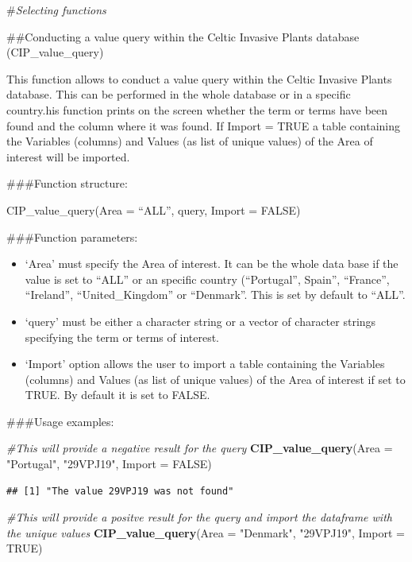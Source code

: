 \documentclass[
]{article}
\newenvironment{Shaded}{\begin{snugshade}}{\end{snugshade}}
\newcommand{\AttributeTok}[1]{\textcolor[rgb]{0.13,0.29,0.53}{#1}}
\newcommand{\CommentTok}[1]{\textcolor[rgb]{0.56,0.35,0.01}{\textit{#1}}}
\newcommand{\ConstantTok}[1]{\textcolor[rgb]{0.56,0.35,0.01}{#1}}
\newcommand{\FunctionTok}[1]{\textcolor[rgb]{0.13,0.29,0.53}{\textbf{#1}}}
\newcommand{\NormalTok}[1]{#1}
\newcommand{\StringTok}[1]{\textcolor[rgb]{0.31,0.60,0.02}{#1}}
\providecommand{\tightlist}{%
  \setlength{\itemsep}{0pt}\setlength{\parskip}{0pt}}
\begin{document}
\#\emph{Selecting functions}

\#\#Conducting a value query within the Celtic Invasive Plants database
(CIP\_value\_query)

This function allows to conduct a value query within the Celtic Invasive
Plants database. This can be performed in the whole database or in a
specific country.his function prints on the screen whether the term or
terms have been found and the column where it was found. If Import =
TRUE a table containing the Variables (columns) and Values (as list of
unique values) of the Area of interest will be imported.

\#\#\#Function structure:

CIP\_value\_query(Area = ``ALL'', query, Import = FALSE)

\#\#\#Function parameters:

\begin{itemize}
\tightlist
\item
  `Area' must specify the Area of interest. It can be the whole data
  base if the value is set to ``ALL'' or an specific country
  (``Portugal'', Spain'', ``France'', ``Ireland'', ``United\_Kingdom''
  or ``Denmark''. This is set by default to ``ALL''.
\item
  `query' must be either a character string or a vector of character
  strings specifying the term or terms of interest.
\item
  `Import' option allows the user to import a table containing the
  Variables (columns) and Values (as list of unique values) of the Area
  of interest if set to TRUE. By default it is set to FALSE.
\end{itemize}

\#\#\#Usage examples:

\begin{Shaded}
\begin{Highlighting}[]
\CommentTok{\#This will provide a negative result for the query}
\FunctionTok{CIP\_value\_query}\NormalTok{(}\AttributeTok{Area =} \StringTok{"Portugal"}\NormalTok{, }\StringTok{"29VPJ19"}\NormalTok{, }\AttributeTok{Import =} \ConstantTok{FALSE}\NormalTok{)}
\end{Highlighting}
\end{Shaded}

\begin{verbatim}
## [1] "The value 29VPJ19 was not found"
\end{verbatim}

\begin{Shaded}
\begin{Highlighting}[]
\CommentTok{\#This will provide a positve result for the query and import the dataframe with the unique values}
\FunctionTok{CIP\_value\_query}\NormalTok{(}\AttributeTok{Area =} \StringTok{"Denmark"}\NormalTok{, }\StringTok{"29VPJ19"}\NormalTok{, }\AttributeTok{Import =} \ConstantTok{TRUE}\NormalTok{)}
\end{Highlighting}
\end{Shaded}
\end{document}
